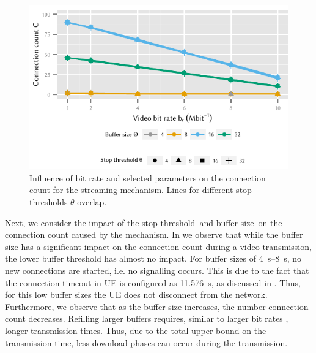 \begin{figure}
  \centering
  \includegraphics{application/lte_video/numerical_evaluation/figures/bitrate2connections_parameters}
  \caption{Influence of bit rate \bitrate and selected parameters on the connection count \connectioncount for the streaming mechanism. Lines for different stop thresholds \(\theta\) overlap.}
  \label{fig:application:lte_video:numerical_evaluation:energy_consumption:bitrate2connections_parameters}
\end{figure}

Next, we consider the impact of the stop threshold~\bufferlower and buffer size~\buffersize on the connection count \connectioncount caused by the \streaming mechanism.
In  we observe that while the buffer size has a significant impact on the connection count \connectioncount during a video transmission, the lower buffer threshold has almost no impact.
For buffer sizes of \SIrange{4}{8}{\second}, no new connections are started, i.e. no signalling occurs.
This is due to the fact that the connection timeout in \gls{UE} is configured as \SI{11.576}{\second}, as discussed in .
Thus, for this low buffer sizes the \gls{UE} does not disconnect from the network.
Furthermore, we observe that as the buffer size increases, the number connection count \connectioncount decreases.
Refilling larger buffers requires, similar to larger bit rates \bitrate, longer transmission times.
Thus, due to the total upper bound on the transmission time, less download phases can occur during the transmission.